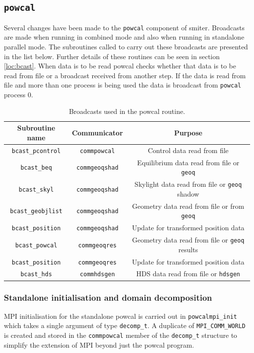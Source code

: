 \subsection{\tt powcal}
Several changes have been made to the {\tt powcal} component of smiter. Broadcasts are made when running in combined mode and also when running in standalone parallel mode. The subroutines called to carry out these broadcasts are presented in the list below. Further details of these routines can be seen in section \ref{loc:bcast}. When data is to be read powcal checks whether that data is to be read from file or a broadcast received from another step. If the data is read from file and more than one process is being used the data is broadcast from {\tt powcal} process 0.

\begin{table}
  \begin{center}
    \begin{tabular}{ | c | c | c | }
      \hline
      Subroutine name  & Communicator  &  Purpose \\
      \hline
      {\tt bcast\_pcontrol} & {\tt commpowcal} & Control data read from file \\ \hline
      {\tt bcast\_beq} & {\tt commgeoqshad} & Equilibrium data read from file or {\tt geoq} \\ \hline
      {\tt bcast\_skyl} & {\tt commgeoqshad} & Skylight data read from file or {\tt geoq} shadow \\ \hline
      {\tt bcast\_geobjlist} & {\tt commgeoqshad} & Geometry data read from file or from {\tt geoq} \\ 
      {\tt bcast\_position} & {\tt commgeoqshad} & Update for transformed position data \\  \hline
      {\tt bcast\_powcal} & {\tt commgeoqres} & Geometry data read from file or {\tt geoq} results \\
      {\tt bcast\_position} & {\tt commgeoqres} & Update for transformed position data \\  \hline
      {\tt bcast\_hds} & {\tt commhdsgen} & HDS data read from file or {\tt hdsgen}\\
      \hline
    \end{tabular}
    \caption{Broadcasts used in the powcal routine.\label{tab:powcalBcasts}}
  \end{center}
\end{table}



\subsubsection{Standalone initialisation and domain decomposition}
MPI initialisation for the standalone powcal is carried out in {\tt powcalmpi\_init} which takes a single argument of type {\tt decomp\_t}. A duplicate of {\tt MPI\_COMM\_WORLD} is created and stored in the {\tt commpowcal} member of the {\tt decomp\_t} structure to simplify the extension of MPI beyond just the powcal program.

